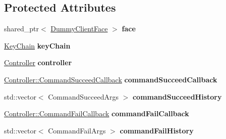 \subsection*{Protected Attributes}
\begin{DoxyCompactItemize}
\item 
shared\+\_\+ptr$<$ \hyperlink{classndn_1_1util_1_1DummyClientFace}{Dummy\+Client\+Face} $>$ {\bfseries face}\hypertarget{classndn_1_1nfd_1_1tests_1_1CommandFixture_ace31872aebdcf7739d1686fb9fc3fae7}{}\label{classndn_1_1nfd_1_1tests_1_1CommandFixture_ace31872aebdcf7739d1686fb9fc3fae7}

\item 
\hyperlink{classndn_1_1security_1_1KeyChain}{Key\+Chain} {\bfseries key\+Chain}\hypertarget{classndn_1_1nfd_1_1tests_1_1CommandFixture_a0bad88a253cad3b0284db3fa7479ad0f}{}\label{classndn_1_1nfd_1_1tests_1_1CommandFixture_a0bad88a253cad3b0284db3fa7479ad0f}

\item 
\hyperlink{classndn_1_1nfd_1_1Controller}{Controller} {\bfseries controller}\hypertarget{classndn_1_1nfd_1_1tests_1_1CommandFixture_a7752c5d3008113116efcd2b46f7052a6}{}\label{classndn_1_1nfd_1_1tests_1_1CommandFixture_a7752c5d3008113116efcd2b46f7052a6}

\item 
\hyperlink{classndn_1_1nfd_1_1Controller_a7dde1f6afdc8f2b58bc3dc6b4661a4f4}{Controller\+::\+Command\+Succeed\+Callback} {\bfseries command\+Succeed\+Callback}\hypertarget{classndn_1_1nfd_1_1tests_1_1CommandFixture_ad82ca86eceb6d250902de9c9fe803f45}{}\label{classndn_1_1nfd_1_1tests_1_1CommandFixture_ad82ca86eceb6d250902de9c9fe803f45}

\item 
std\+::vector$<$ Command\+Succeed\+Args $>$ {\bfseries command\+Succeed\+History}\hypertarget{classndn_1_1nfd_1_1tests_1_1CommandFixture_af696a73e9ff2964eaaf707590ba689af}{}\label{classndn_1_1nfd_1_1tests_1_1CommandFixture_af696a73e9ff2964eaaf707590ba689af}

\item 
\hyperlink{classndn_1_1nfd_1_1Controller_ad1a5fe51dfacb28c3fb624f03e9f50bb}{Controller\+::\+Command\+Fail\+Callback} {\bfseries command\+Fail\+Callback}\hypertarget{classndn_1_1nfd_1_1tests_1_1CommandFixture_a4c36c4c900f1a66b0636eb30c4108974}{}\label{classndn_1_1nfd_1_1tests_1_1CommandFixture_a4c36c4c900f1a66b0636eb30c4108974}

\item 
std\+::vector$<$ Command\+Fail\+Args $>$ {\bfseries command\+Fail\+History}\hypertarget{classndn_1_1nfd_1_1tests_1_1CommandFixture_aa38e111c9a10fb2b3b007772b0993644}{}\label{classndn_1_1nfd_1_1tests_1_1CommandFixture_aa38e111c9a10fb2b3b007772b0993644}

\end{DoxyCompactItemize}
